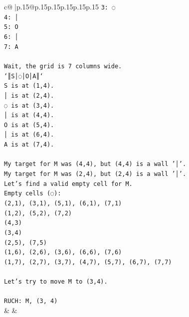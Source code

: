 \documentclass{article}
\begin{document}
{\begin{supertabular}{c@{$\;$}|p{.15\linewidth}@{}p{.15\linewidth}p{.15\linewidth}p{.15\linewidth}p{.15\linewidth}p{.15\linewidth}}
{{{\texttt{3: ◌} \\
\texttt{4: │} \\
\texttt{5: O} \\
\texttt{6: │} \\
\texttt{7: A} \\
\\ 
\texttt{Wait, the grid is 7 columns wide.} \\
\texttt{`║S│◌│O│A║`} \\
\texttt{S is at (1,4).} \\
\texttt{│ is at (2,4).} \\
\texttt{◌ is at (3,4).} \\
\texttt{│ is at (4,4).} \\
\texttt{O is at (5,4).} \\
\texttt{│ is at (6,4).} \\
\texttt{A is at (7,4).} \\
\\ 
\texttt{My target for M was (4,4), but (4,4) is a wall '│'.} \\
\texttt{My target for M was (2,4), but (2,4) is a wall '│'.} \\
\texttt{Let's find a valid empty cell for M.} \\
\texttt{Empty cells (◌):} \\
\texttt{(2,1), (3,1), (5,1), (6,1), (7,1)} \\
\texttt{(1,2), (5,2), (7,2)} \\
\texttt{(4,3)} \\
\texttt{(3,4)} \\
\texttt{(2,5), (7,5)} \\
\texttt{(1,6), (2,6), (3,6), (6,6), (7,6)} \\
\texttt{(1,7), (2,7), (3,7), (4,7), (5,7), (6,7), (7,7)} \\
\\ 
\texttt{Let's try to move M to (3,4).} \\
\\ 
\texttt{RUCH: M, (3, 4)} \\
            }
        }
    }
    & & \\ \\


\end{supertabular}}
\end{document}

